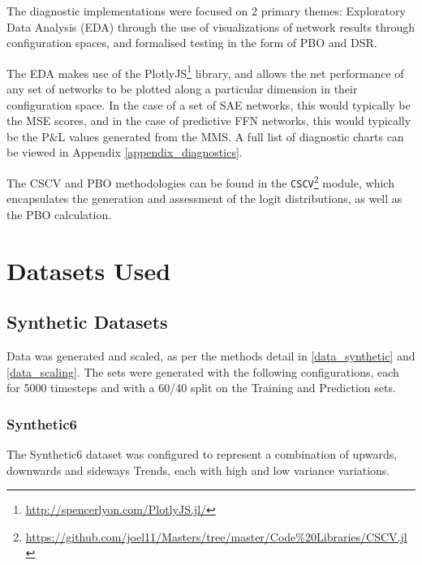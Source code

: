\documentclass[a4paper,11pt,oneside]{article}
\theoremstyle{plain}
\theoremstyle{definition}
\begin{document}
	The diagnostic implementations were focused on 2 primary themes: Exploratory Data Analysis (EDA) through the use of visualizations of network results through configuration spaces, and formalised testing in the form of PBO and DSR.
	
	The EDA makes use of the PlotlyJS\footnote{\url{http://spencerlyon.com/PlotlyJS.jl/}} library, and allows the net performance of any set of networks to be plotted along a particular dimension in their configuration space. In the case of a set of SAE networks, this would typically be the MSE scores, and in the case of predictive FFN networks, this would typically be the P\&L values generated from the MMS. A full list of diagnostic charts can be viewed in Appendix \ref{appendix_diagnostics}. \newline
	
	The CSCV and PBO methodologies can be found in the \texttt{CSCV}\footnote{\url{https://github.com/joel11/Masters/tree/master/Code\%20Libraries/CSCV.jl}} module, which encapsulates the generation and assessment of the logit distributions, as well as the PBO calculation.
	
	
	\newpage
	\section{Datasets Used}\label{Datasets}
	
	\subsection{Synthetic Datasets}
	
	Data was generated and scaled, as per the methods detail in \ref{data_synthetic} and \ref{data_scaling}. The sets were generated with the following configurations, each for 5000 timesteps and with a 60/40 split on the Training and Prediction sets.
	
	\subsubsection{Synthetic6} \label{dataset_synthetic6}
	
	The Synthetic6 dataset was configured to represent a combination of upwards, downwards and sideways Trends, each with high and low variance variations.
	
\end{document}
